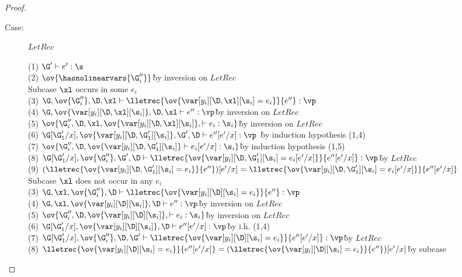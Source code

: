 \begin{proof}
\begin{description}
\item[Case:] $LetRec$
\begin{tabbing}
  (1) $\G' \vdash e' : \s$\\
  (2) $\ov{\hasnolinearvars{\G''_i}}$\` by inversion on $LetRec$\\
  Subcase $\xl$ occurs in some $e_i$\\
  (3) $\G, \ov{\G''_i}, \D, \xl \vdash \lletrec{\ov{\var[y_i][\D,\xl][\s_i] = e_i}}{e''} : \vp$\\
  (4) $\G, \ov{\var[y_i][\D,\xl][\s_i]}, \D, \xl \vdash e'' : \vp$\` by inversion on $LetRec$\\
  (5) $\ov{\G''_i, \D, \xl, \ov{\var[y_i][\D, \xl][\s_i]}, \vdash e_i : \s_i}$\` by inversion on $LetRec$\\
  (6) $\G[\G'_1/x], \ov{\var[y_i][\D, \G'_1][\s_i]}, \G', \D \vdash e''[e'/x] : \vp$ \` by induction hypothesis (1,4)\\
  (7) $\ov{\G''_i, \D, \ov{\var[y_i][\D, \G'_1][\s_i]} \vdash e_i[e'/x] : \s_i}$\` by induction hypothesis (1,5)\\
  (8) $\G[\G'_1/x], \ov{\G''_i}, \G', \D \vdash \lletrec{\ov{\var[y_i][\D,\G'_1][\s_i] = e_i[e'/x]}}{e''[e'/x]} : \vp$\` by $LetRec$\\
  (9) $(\lletrec{\ov{\var[y_i][\D,\G'_1][\s_i] = e_i}}{e''})[e'/x] = \lletrec{\ov{\var[y_i][\D,\G'_1][\s_i] = e_i[e'/x]}}{e''[e'/x]}$\\
  Subcase $\xl$ does not occur in any $e_i$\\
  (3) $\G, \xl, \ov{\G''_i}, \D \vdash \lletrec{\ov{\var[y_i][\D][\s_i] = e_i}}{e''} : \vp$\\
  (4) $\G, \xl, \ov{\var[y_i][\D][\s_i]}, \D \vdash e'' : \vp$\` by inversion on $LetRec$\\
  (5) $\ov{\G''_i, \D, \ov{\var[y_i][\D][\s_i]}, \vdash e_i : \s_i}$\` by inversion on $LetRec$\\
  (6) $\G[\G'_1/x], \ov{\var[y_i][\D][\s_i]}, \D \vdash e''[e'/x] : \vp$\` by i.h. (1,4)\\
  (7) $\G[\G'_1/x], \ov{\G''_i}, \D, \G' \vdash \lletrec{\ov{\var[y_i][\D][\s_i] = e_i}}{e''[e'/x]} : \vp$\` by $LetRec$\\
  (8) $\lletrec{\ov{\var[y_i][\D][\s_i] = e_i}}{e''[e'/x]} =
  (\lletrec{\ov{\var[y_i][\D][\s_i] = e_i}}{e''})[e'/x]$\` by subcase\\
\end{tabbing}


\end{description}
\end{proof}
